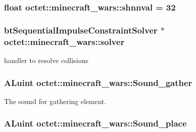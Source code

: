 \hypertarget{classoctet_1_1minecraft__wars_a787dde65a444e4e71eb3994ced4a1f46}{
\subsubsection[{shnnval}]{\setlength{\rightskip}{0pt plus 5cm}float octet\+::minecraft\+\_\+wars\+::shnnval = 32\hspace{0.3cm}{\ttfamily [private]}}}\label{classoctet_1_1minecraft__wars_a787dde65a444e4e71eb3994ced4a1f46}
\hypertarget{classoctet_1_1minecraft__wars_adbb4181c0f1c875551b55294cb6e3fca}{
\subsubsection[{solver}]{\setlength{\rightskip}{0pt plus 5cm}bt\+Sequential\+Impulse\+Constraint\+Solver $\ast$ octet\+::minecraft\+\_\+wars\+::solver\hspace{0.3cm}{\ttfamily [private]}}}\label{classoctet_1_1minecraft__wars_adbb4181c0f1c875551b55294cb6e3fca}


handler to resolve collisions 

\hypertarget{classoctet_1_1minecraft__wars_a074eafb7ecaee55ddd999c8a9c26bb62}{
\subsubsection[{Sound\+\_\+gather}]{\setlength{\rightskip}{0pt plus 5cm}A\+Luint octet\+::minecraft\+\_\+wars\+::\+Sound\+\_\+gather\hspace{0.3cm}{\ttfamily [private]}}}\label{classoctet_1_1minecraft__wars_a074eafb7ecaee55ddd999c8a9c26bb62}


The sound for gathering element. 

\hypertarget{classoctet_1_1minecraft__wars_a49c6d9bfd8211e8627e609be0be42f77}{
\subsubsection[{Sound\+\_\+place}]{\setlength{\rightskip}{0pt plus 5cm}A\+Luint octet\+::minecraft\+\_\+wars\+::\+Sound\+\_\+place\hspace{0.3cm}{\ttfamily [private]}}}\label{classoctet_1_1minecraft__wars_a49c6d9bfd8211e8627e609be0be42f77}


